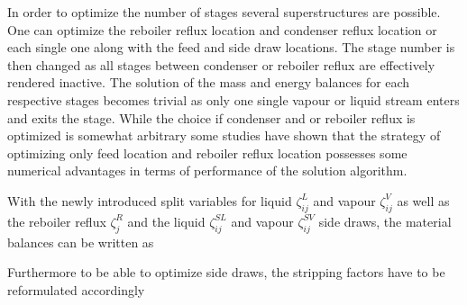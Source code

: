        In order to optimize the number of stages several superstructures are possible. One can
        optimize the reboiler reflux location and condenser reflux location or each single one
        along with the feed and side draw locations. The stage number is then changed as all stages
        between condenser or reboiler reflux are effectively rendered inactive. The solution of
        the mass and energy balances for each respective stages becomes trivial as only one single
        vapour or liquid stream enters and exits the stage. While the choice if condenser and or reboiler
        reflux is optimized is somewhat arbitrary some studies have shown \cite{Grossmann.2005} that
        the strategy of optimizing only feed location and reboiler reflux location possesses some
        numerical advantages in terms of performance of the solution algorithm.

        With the newly introduced split variables for liquid $\zeta^L_{ij}$ and vapour $\zeta^V_{ij}$
        as well as the reboiler reflux $\zeta^R_j$ and the liquid $\zeta^{SL}_{ij}$ and vapour $\zeta^{SV}_{ij}$
        side draws, the material balances can be written as

        Furthermore to be able to optimize side draws, the stripping factors have to be reformulated
        accordingly

